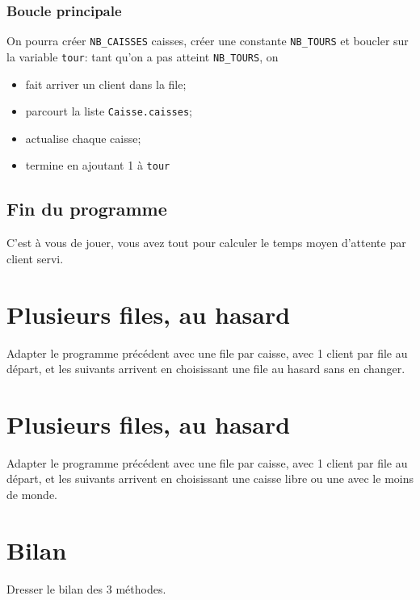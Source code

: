 \documentclass[10pt,firamath,cours]{nsi}
\begin{document}
\begin{exercice}
\begin{itemize}
\subsubsection*{Boucle principale}
On pourra créer \texttt{NB_CAISSES} caisses, créer une constante \texttt{NB_TOURS} et boucler sur la variable \texttt{tour}: tant qu'on a pas atteint  \texttt{NB_TOURS}, on
\begin{itemize}
    \item fait arriver un client dans la file;
	\item parcourt la liste \texttt{Caisse.caisses};
    \item actualise chaque caisse;
    \item termine en ajoutant 1 à \texttt{tour}
\end{itemize}
\subsection*{Fin du programme}
C'est à vous de jouer, vous avez tout pour calculer le temps moyen d'attente par client servi.
\end{itemize}

\section*{Plusieurs files, au hasard}
Adapter le programme précédent avec une file par caisse, avec 1 client par file au départ, et les suivants arrivent en choisissant une file au hasard sans en changer.

\section*{Plusieurs files, au hasard}
Adapter le programme précédent avec une file par caisse, avec 1 client par file au départ, et les suivants arrivent en choisissant une caisse libre ou une avec le moins de monde.

\section*{Bilan}
Dresser le bilan des 3 méthodes.

\end{exercice}
\end{document}
